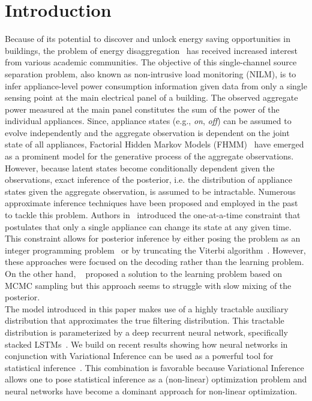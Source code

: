 \section{Introduction}
Because of its potential to discover and unlock energy saving opportunities in buildings, the problem of energy disaggregation~\cite{hart1992} has received increased interest from various academic communities. The objective of this single-channel source separation problem, also known as non-intrusive load monitoring (NILM), is to infer appliance-level power consumption information given data from only a single sensing point at the main electrical panel of a building. The observed aggregate power measured at the main panel constitutes the sum of the power of the individual appliances. Since, appliance states (e.g., {\em on}, {\em off}) can be assumed to evolve independently and the aggregate observation is dependent on the joint state of all appliances, Factorial Hidden Markov Models (FHMM)~\cite{ghahramani1997factorial} have emerged as a prominent model for the generative process of the aggregate observations. However, because latent states become conditionally dependent given the observations, exact inference of the posterior, i.e. the distribution of appliance states given the aggregate observation, is assumed to be intractable. Numerous approximate inference techniques have been proposed and employed in the past to tackle this problem. Authors in~\cite{kolter2012fhmm} introduced the one-at-a-time constraint that postulates that only a single appliance can change its state at any given time. This constraint allows for posterior inference by either posing the problem as an integer programming problem~\cite{kolter2012fhmm} or by truncating the Viterbi algorithm~\cite{lange2016efficient}. However, these approaches were focused on the decoding rather than the learning problem. On the other hand, ~\cite{jia2015fully} proposed a solution to the learning problem based on MCMC sampling but this approach seems to struggle with slow mixing of the posterior.\\
The model introduced in this paper makes use of a highly tractable auxiliary distribution that approximates the true filtering distribution. This tractable distribution is parameterized by a deep recurrent neural network, specifically stacked LSTMs~\cite{hochreiter1997long}. We build on recent results showing how neural networks in conjunction with Variational Inference can be used as a powerful tool for statistical inference~\cite{kingma2013auto}. This combination is favorable because Variational Inference allows one to pose statistical inference as a (non-linear) optimization problem and neural networks have become a dominant approach for non-linear optimization.\\
